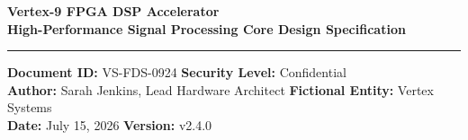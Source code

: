 \documentclass[10pt,letterpaper]{article}
\begin{document}
\thispagestyle{empty}
\begin{tcolorbox}[
    colback=primary,
    colframe=primary,
    arc=0mm,
    outer arc=0mm,
    left=20pt,
    right=20pt,
    top=25pt,
    bottom=25pt,
    coltext=white
]
    {\Huge \bfseries \sffamily \faMicrochip \hspace{10pt} Vertex-9 FPGA DSP Accelerator}\\[12pt]
    {\large \bfseries \sffamily High-Performance Signal Processing Core Design Specification}\\[15pt]
    \textcolor{secondary!40}{\rule{\linewidth}{1.5pt}}\par\vspace{10pt}
    {\sffamily \small
     \faFile* \hspace{3pt} \textbf{Document ID:} VS-FDS-0924 \hfill \faLock \hspace{3pt} \textbf{Security Level:} Confidential\\
     \faUser \hspace{3pt} \textbf{Author:} Sarah Jenkins, Lead Hardware Architect \hfill \faBuilding \hspace{3pt} \textbf{Fictional Entity:} Vertex Systems\\
     \faCalendar \hspace{3pt} \textbf{Date:} July 15, 2026 \hfill \faTag \hspace{3pt} \textbf{Version:} v2.4.0}
\end{tcolorbox}

\vspace{5pt}








\end{document}

